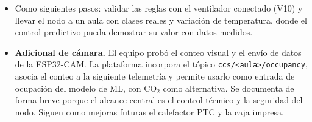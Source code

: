 \documentclass[10pt,a4paper]{article}
\newcommand{\cod}[1]{\texttt{\small #1}}
\begin{document}
\begin{itemize}[leftmargin=12pt]
  \item Como siguientes pasos: validar las reglas con el ventilador conectado (V10) y llevar el nodo a un aula con clases reales y variación de temperatura, donde el control predictivo pueda demostrar su valor con datos medidos.
  \item \textbf{Adicional de cámara.} El equipo probó el conteo visual y el envío de datos de la ESP32-CAM. La plataforma incorpora el tópico \cod{ccs/<aula>/occupancy}, asocia el conteo a la siguiente telemetría y permite usarlo como entrada de ocupación del modelo de ML, con CO$_2$ como alternativa. Se documenta de forma breve porque el alcance central es el control térmico y la seguridad del nodo. Siguen como mejoras futuras el calefactor PTC y la caja impresa.
\end{itemize}
\end{document}
